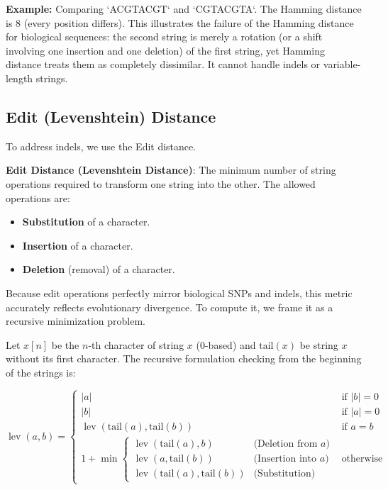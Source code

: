 \textbf{Example:}
Comparing `ACGTACGT` and `CGTACGTA`. The Hamming distance is 8 (every position differs).
This illustrates the failure of the Hamming distance for biological sequences: the second string is merely a rotation (or a shift involving one insertion and one deletion) of the first string, yet Hamming distance treats them as completely dissimilar. It cannot handle indels or variable-length strings.

\subsection{Edit (Levenshtein) Distance}

To address indels, we use the Edit distance.

\begin{important}
    \textbf{Edit Distance (Levenshtein Distance)}: The minimum number of string operations required to transform one string into the other. The allowed operations are:
    \begin{itemize}
        \item \textbf{Substitution} of a character.
        \item \textbf{Insertion} of a character.
        \item \textbf{Deletion} (removal) of a character.
    \end{itemize}
\end{important}

Because edit operations perfectly mirror biological SNPs and indels, this metric accurately reflects evolutionary divergence. To compute it, we frame it as a recursive minimization problem. 

Let $x[n]$ be the $n$-th character of string $x$ (0-based) and $\text{tail}(x)$ be string $x$ without its first character. The recursive formulation checking from the beginning of the strings is:

\[
\operatorname{lev}(a,b) = 
\begin{cases}
|a| & \text{if } |b| = 0 \\
|b| & \text{if } |a| = 0 \\
\operatorname{lev}(\text{tail}(a), \text{tail}(b)) & \text{if } a = b \\
1 + \min \begin{cases} 
\operatorname{lev}(\text{tail}(a), b) & \text{(Deletion from } a \text{)} \\
\operatorname{lev}(a, \text{tail}(b)) & \text{(Insertion into } a \text{)} \\
\operatorname{lev}(\text{tail}(a), \text{tail}(b)) & \text{(Substitution)}
\end{cases} & \text{otherwise}
\end{cases}
\]


